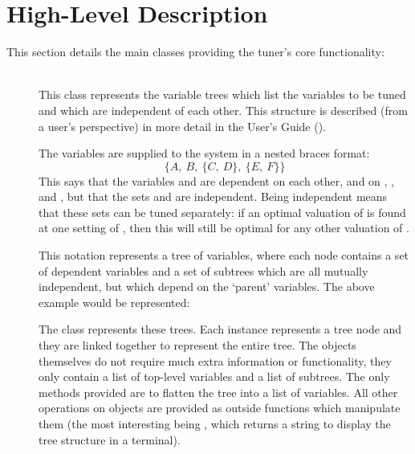 \documentclass[a4paper, draft]{article}
\begin{document}
\section{High-Level Description}
This section details the main classes providing the tuner's core 
functionality:

\begin{description}
    
    \item[] \hfill\\
        This class represents the variable trees which list the variables to 
        be tuned and which are independent of each other. This structure is 
        described (from a user's perspective) in more detail in the 
        User's Guide (). 
        
        The variables are supplied to the system in a nested braces format:
        \[\{A,~B,~\{C,~D\},~\{E,~F\}\}\]
        This says that the variables  and  are dependent on each 
        other, and on , ,  and , but that the sets 
         and  are independent. Being independent 
        means that these sets can be tuned separately: if an optimal valuation 
        of  is found at one setting of , then this 
        will still be optimal for any other valuation of .
        
        This notation represents a tree of variables, where each node contains 
        a set of dependent variables and a set of subtrees which are all 
        mutually independent, but which depend on the `parent' variables. The 
        above example would be represented:
        \treeDrawABCDEF
        
        The  class represents these trees. Each instance 
        represents a tree node and they are linked together to represent the 
        entire tree. The objects themselves do not require much extra 
        information or functionality, they only contain a list of top-level 
        variables and a list of subtrees. The only methods provided are to 
        flatten the tree into a list of variables. All other operations on 
         objects are provided as outside functions which 
        manipulate them (the most interesting being , 
        which returns a string to display the tree structure in a terminal).
        
        
        

\end{description}
\end{document}
